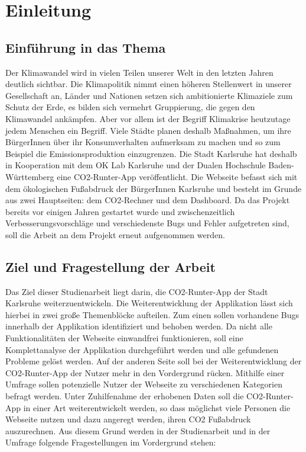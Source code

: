 
\chapter{Einleitung}
\label{chapter:1}

\section{Einführung in das Thema}

Der Klimawandel wird in vielen Teilen unserer Welt in den letzten Jahren deutlich sichtbar.
Die Klimapolitik nimmt einen höheren Stellenwert in unserer Gesellschaft an, Länder und Nationen setzen sich ambitionierte Klimaziele zum Schutz der Erde, es bilden sich vermehrt Gruppierung, die gegen den Klimawandel ankämpfen. Aber vor allem ist der Begriff Klimakrise heutzutage jedem Menschen ein Begriff. Viele Städte planen deshalb Maßnahmen, um ihre BürgerInnen über ihr Konsumverhalten aufmerksam zu machen und so zum Beispiel die Emissionsproduktion einzugrenzen.  Die Stadt Karlsruhe hat deshalb in Kooperation mit dem OK Lab Karlsruhe und der Dualen Hochschule Baden-Württemberg eine CO2-Runter-App veröffentlicht. Die Webseite befasst sich mit dem ökologischen Fußabdruck der BürgerInnen Karlsruhe und besteht im Grunde aus zwei Hauptseiten: dem CO2-Rechner und dem Dashboard. Da das Projekt bereits vor einigen Jahren gestartet wurde und zwischenzeitlich Verbesserungsvorschläge und verschiedenste Bugs und Fehler aufgetreten sind, soll die Arbeit an dem Projekt erneut aufgenommen werden.

\section{Ziel und Fragestellung der Arbeit}

Das Ziel dieser Studienarbeit liegt darin, die CO2-Runter-App der Stadt Karlsruhe weiterzuentwickeln. Die Weiterentwicklung der Applikation lässt sich hierbei in zwei große Themenblöcke aufteilen. Zum einen sollen vorhandene Bugs innerhalb der Applikation identifiziert und behoben werden. Da nicht alle Funktionalitäten der Webseite einwandfrei funktionieren, soll eine Komplettanalyse der Applikation durchgeführt werden und alle gefundenen Probleme gelöst werden. Auf der anderen Seite soll bei der Weiterentwicklung der CO2-Runter-App der Nutzer mehr in den Vordergrund rücken. Mithilfe einer Umfrage sollen potenzielle Nutzer der Webseite zu verschiedenen Kategorien befragt werden. Unter Zuhilfenahme der erhobenen Daten soll die CO2-Runter-App in einer Art weiterentwickelt werden, so dass möglichst viele Personen die Webseite nutzen und dazu angeregt werden, ihren CO2 Fußabdruck auszurechnen. Aus diesem Grund werden in der Studienarbeit und in der Umfrage folgende Fragestellungen im Vordergrund stehen:

